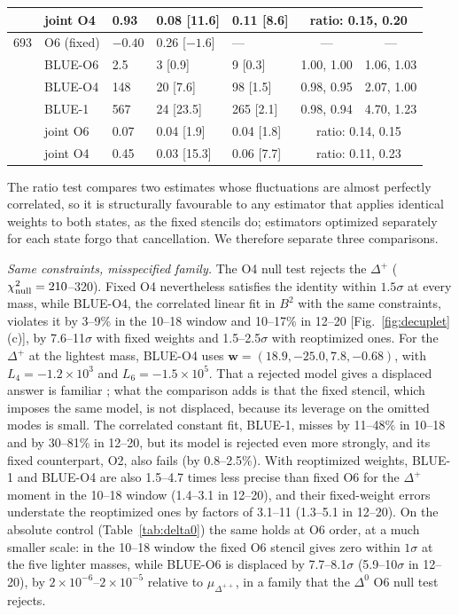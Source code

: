 \documentclass[aps,prd,reprint,twocolumn,superscriptaddress,nofootinbib,longbibliography]{revtex4-2}
\begin{document}
\begin{table}[t]
\begin{tabular}{cllllcc}
    & joint O4 & 0.93 & 0.08 [11.6] & 0.11 [8.6] & \multicolumn{2}{c}{ratio: 0.15, 0.20}\\
\midrule
693 & O6 (fixed) & $-0.40$ & 0.26 [$-1.6$] & --- & --- & ---\\
    & BLUE-O6 & 2.5 & 3 [0.9] & 9 [0.3] & 1.00, 1.00 & 1.06, 1.03\\
    & BLUE-O4 & 148 & 20 [7.6] & 98 [1.5] & 0.98, 0.95 & 2.07, 1.00\\
    & BLUE-1 & 567 & 24 [23.5] & 265 [2.1] & 0.98, 0.94 & 4.70, 1.23\\
    & joint O6 & 0.07 & 0.04 [1.9] & 0.04 [1.8] & \multicolumn{2}{c}{ratio: 0.14, 0.15}\\
    & joint O4 & 0.45 & 0.03 [15.3] & 0.06 [7.7] & \multicolumn{2}{c}{ratio: 0.11, 0.23}\\
\bottomrule
\end{tabular}
\end{table}

The ratio test compares two estimates whose fluctuations are almost perfectly correlated, so it is structurally favourable to any estimator that applies identical weights to both states, as the fixed stencils do; estimators optimized separately for each state forgo that cancellation. We therefore separate three comparisons.

\emph{Same constraints, misspecified family.} The O4 null test rejects the $\Delta^+$ ($\chi^2_{\rm null}=210$--320). Fixed O4 nevertheless satisfies the identity within $1.5\sigma$ at every mass, while BLUE-O4, the correlated linear fit in $B^2$ with the same constraints, violates it by 3--9\% in the 10--18 window and 10--17\% in 12--20 [Fig.~\ref{fig:decuplet}(c)], by 7.6--11$\sigma$ with fixed weights and 1.5--2.5$\sigma$ with reoptimized ones. For the $\Delta^+$ at the lightest mass, BLUE-O4 uses $\bm w=(18.9,-25.0,7.8,-0.68)$, with $L_4=-1.2\times10^3$ and $L_6=-1.5\times10^5$. That a rejected model gives a displaced answer is familiar \cite{DAgostini1994}; what the comparison adds is that the fixed stencil, which imposes the same model, is not displaced, because its leverage on the omitted modes is small. The correlated constant fit, BLUE-1, misses by 11--48\% in 10--18 and by 30--81\% in 12--20, but its model is rejected even more strongly, and its fixed counterpart, O2, also fails (by 0.8--2.5\%). With reoptimized weights, BLUE-1 and BLUE-O4 are also 1.5--4.7 times less precise than fixed O6 for the $\Delta^+$ moment in the 10--18 window (1.4--3.1 in 12--20), and their fixed-weight errors understate the reoptimized ones by factors of 3.1--11 (1.3--5.1 in 12--20). On the absolute control (Table~\ref{tab:delta0}) the same holds at O6 order, at a much smaller scale: in the 10--18 window the fixed O6 stencil gives zero within $1\sigma$ at the five lighter masses, while BLUE-O6 is displaced by 7.7--8.1$\sigma$ (5.9--10$\sigma$ in 12--20), by $2\times10^{-6}$--$2\times10^{-5}$ relative to $\mu_{\Delta^{++}}$, in a family that the $\Delta^0$ O6 null test rejects.
\end{document}
